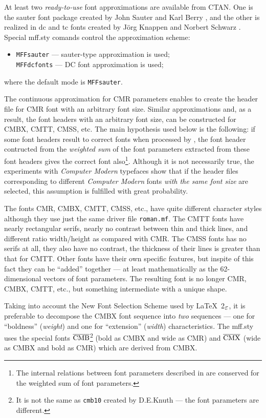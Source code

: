 At least two {\em ready-to-use} font approximations are available from
CTAN. One is the {\sc sauter} font package created by
John Sauter and Karl Berry \cite{SAUTER}, and the other is realized
in {\sc dc} and {\sc tc} fonts created by J\"org Knappen and Norbert
Schwarz \cite{DC}. Special {\sc mff.sty} comands control
the approximation scheme:
\begin{itemize}
\item[] {\tt \bs{}MFFsauter} --- {\sc sauter}-type approximation
        is used;\\
        {\tt \bs{}MFFdcfonts} --- {\sc DC font} approximation
        is used;
\end{itemize}
where the default mode is {\tt\bs{}MFFsauter}.

The continuous approximation for CMR parameters enables to create
the \MF{} header file for CMR font with an arbitrary font size.
Similar approximations and, as a result, the font headers with
an arbitrary font size, can be constructed for CMBX, CMTT, CMSS, etc.
The main hypothesis used below is the following:
if some font headers result to correct fonts when processed by \MF{},
the font header contructed from the {\em weighted sum} of the font
parameters extracted from these font headers gives
the correct font also\footnote{The internal relations between
font parameters described in \cite{CM} are conserved for the weighted
sum of font parameters.}.
Although it is not necessarily true, the experiments
with {\sl Computer Modern} typefaces show that if the header files
corresponding to different {\sl Computer Modern} fonts
{\em with the same font size} are selected, this assumption is fulfilled
with great probability.

The fonts CMR, CMBX, CMTT, CMSS, etc., have quite different
character styles although they use just the same \MF{} driver file
{\tt roman.mf}.
The CMTT fonts have nearly rectangular serifs,
nearly no contrast between thin and thick lines,
and different ratio width/height as compared with CMR.
The CMSS fonts has no serifs at all, they also
have no contrast, the thickness of their lines is greater
than that for CMTT.
Other fonts have their own specific
features, but inspite of this fact they can be ``added''
together --- at least mathematically as the 62-dimensional
vectors of font parameters.
The resulting font is no longer CMR, CMBX, CMTT, etc.,
but something intermediate with a unique shape.

Taking into account the {\sf New Font Selection Scheme} used by
\LaTeX~2$_{\hbox{\normalsize$\varepsilon$}}$,
it is preferable to decompose
the CMBX font sequence into {\em two} sequences --- one
for ``boldness'' ({\em weight}) and one for ``extension''
({\em width}) characteristics.
The {\sc mff.sty} uses the special fonts
$\overline{\hbox{CMB}}$\footnote{It is not the same as
{\tt cmb10} created by D.E.Knuth --- the font parameters
are different.}  (bold as CMBX and wide as
CMR) and $\overline{\hbox{CMX}}$ (wide as CMBX and bold as CMR)
which are derived from CMBX.

